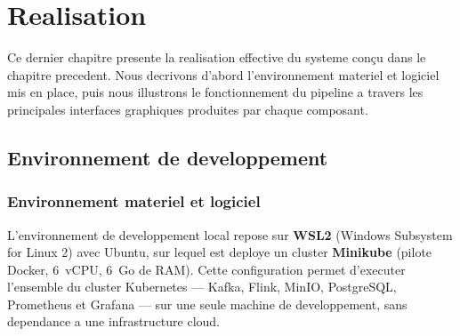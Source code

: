 \chapter{Realisation}
\label{chap:realisation}

\introchapitre

Ce dernier chapitre presente la realisation effective du systeme conçu dans le
chapitre precedent. Nous decrivons d'abord l'environnement materiel et logiciel mis
en place, puis nous illustrons le fonctionnement du pipeline a travers les principales
interfaces graphiques produites par chaque composant.

\section{Environnement de developpement}
\label{sec:env}

\subsection{Environnement materiel et logiciel}

L'environnement de developpement local repose sur \textbf{WSL2} (Windows Subsystem for
Linux 2) avec Ubuntu, sur lequel est deploye un cluster \textbf{Minikube} (pilote
Docker, 6~vCPU, 6~Go de RAM). Cette configuration permet d'executer l'ensemble du
cluster Kubernetes --- Kafka, Flink, MinIO, PostgreSQL, Prometheus et Grafana --- sur
une seule machine de developpement, sans dependance a une infrastructure cloud.


